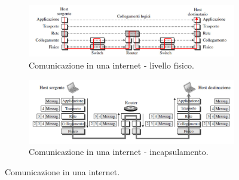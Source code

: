 \documentclass[11pt, italian, openany]{book}
\begin{document}
\begin{sloppypar}
\begin{figure}[h!]
	\begin{subfigure}[t]{0.49 \linewidth} \centering
		\includegraphics[scale=0.18]{images/livello-fisico-tcp_ip.png}
		\caption{Comunicazione in una internet - livello fisico.}
	\end{subfigure}
	\begin{subfigure}[t]{0.49 \linewidth} \centering
		\includegraphics[scale=0.18]{images/incapsulamento-tcp_ip.png}
		\caption{Comunicazione in una internet - incapsulamento.}
	\end{subfigure}
	\caption{Comunicazione in una internet.}
	\label{fig:comunicazione-internet}
\end{figure}


\end{sloppypar}
\end{document}
